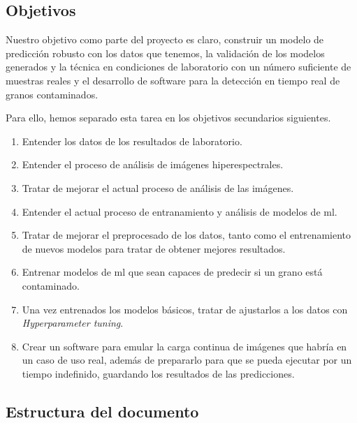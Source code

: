 \subsection{Objetivos}

Nuestro objetivo como parte del proyecto es claro, construir un modelo de predicción robusto con los datos que tenemos, la validación de los modelos generados y la técnica en
condiciones de laboratorio con un número suficiente de muestras reales y el desarrollo de software para la detección en tiempo real de granos contaminados. 

Para ello, hemos separado esta tarea en los objetivos secundarios siguientes. 

\begin{enumerate}
    \item Entender los datos de los resultados de laboratorio.
    \item Entender el proceso de análisis de imágenes hiperespectrales.
    \item Tratar de mejorar el actual proceso de análisis de las imágenes.
    \item Entender el actual proceso de entranamiento y análisis de modelos de \gls{ml}.
    \item Tratar de mejorar el preprocesado de los datos, tanto como el entrenamiento de nuevos modelos para tratar de obtener mejores resultados.
    \item Entrenar modelos de \gls{ml} que sean capaces de predecir si un grano está contaminado. 
    \item Una vez entrenados los modelos básicos, tratar de ajustarlos a los datos con \textit{Hyperparameter tuning}.
    \item Crear un software para emular la carga continua de imágenes que habría en un caso de uso real, además de prepararlo para que se pueda ejecutar por un tiempo indefinido, guardando los resultados de las predicciones.
\end{enumerate}

\subsection{Estructura del documento}

